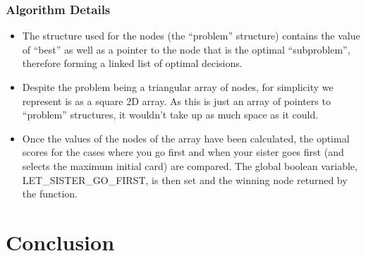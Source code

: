 \documentclass[11pt]{article}
\begin{document}
\subsubsection*{Algorithm Details}
\begin{itemize}
		\item The structure used for the nodes (the ``problem'' structure) contains the value of ``best'' as well as a pointer to the node that is the optimal ``subproblem'', therefore forming a linked list of optimal decisions.
		\item Despite the problem being a triangular array of nodes, for simplicity we represent is as a square 2D array. As this is just an array of pointers to ``problem'' structures, it wouldn't take up as much space as it could.
		\item Once the values of the nodes of the array have been calculated, the optimal scores for the cases where you go 
			first and when your sister goes first (and selects the maximum initial card) are compared. The global boolean variable, 	
			LET\_SISTER\_GO\_FIRST, is then set and the winning node returned by the function.
\end{itemize}


\section{Conclusion}





\end{document}
